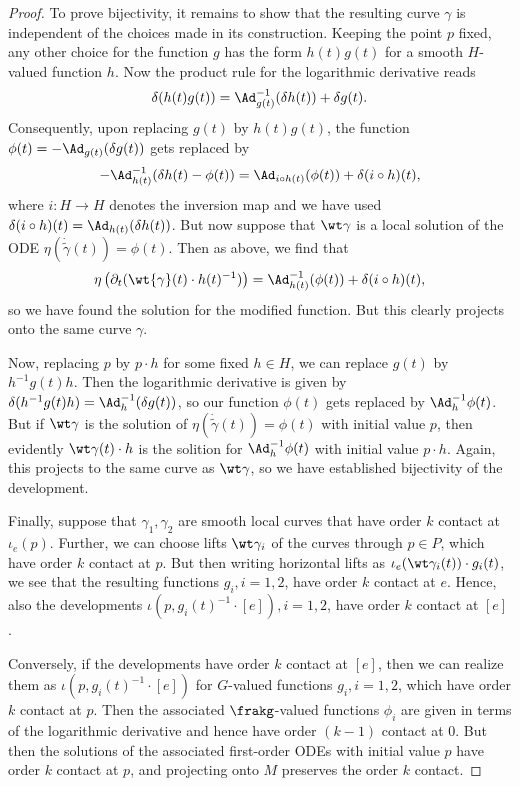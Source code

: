 \begin{proof}
    To prove bijectivity, it remains to show that the resulting curve $\gamma$ is independent of the choices made in its construction. Keeping the point $p$ fixed, any other choice for the function $g$ has the form $h(t)g(t)$ for a smooth $H$-valued function $h$. Now the product rule for the logarithmic derivative reads 
    \[\delta(h(t)g(t))=\Ad_{g(t)}^{-1}(\delta h(t))+\delta g(t).\]
    Consequently, upon replacing $g(t)$ by $h(t)g(t)$, the function $\phi(t)=-\Ad_{g(t)}(\delta g(t))$ gets replaced by 
    \[-\Ad_{h(t)}^{-1}(\delta h(t)-\phi(t))=\Ad_{i\circ h(t)}(\phi(t))+\delta(i\circ h)(t),\]
    where $i:H\to H$ denotes the inversion map and we have used $\delta(i\circ h)(t)=\Ad_{h(t)}(\delta h(t))$. But now suppose that $\wt\gamma$ is a local solution of the ODE $\eta(\dot{\tilde{\gamma}}(t))=\phi(t)$. Then as above, we find that 
    \[\eta\left(\partial_t(\wt{\gamma}(t)\cdot h(t)^{-1})\right)=\Ad_{h(t)}^{-1}(\phi(t))+\delta(i\circ h)(t),\]
    so we have found the solution for the modified function. But this clearly projects onto the same curve $\gamma$.

    Now, replacing $p$ by $p\cdot h$ for some fixed $h\in H$, we can replace $g(t)$ by $h^{-1}g(t)h$. Then the logarithmic derivative is given by $\delta(h^{-1}g(t)h)=\Ad_{h}^{-1}(\delta g(t))$, so our function $\phi(t)$ gets replaced by $\Ad_h^{-1}\phi(t)$. But if $\wt\gamma$ is the solution of $\eta(\dot{\tilde{\gamma}}(t))=\phi(t)$ with initial value $p$, then evidently $\wt\gamma(t)\cdot h$ is the solition for $\Ad_h^{-1}\phi(t)$ with initial value $p\cdot h$. Again, this projects to the same curve as $\wt\gamma$, so we have established bijectivity of the development.

    Finally, suppose that $\gamma_1,\gamma_2$ are smooth local curves that have order $k$ contact at $\iota_e(p)$. Further, we can choose lifts $\wt\gamma_i$ of the curves through $p\in P$, which have order $k$ contact at $p$. But then writing horizontal lifts as $\iota_e(\wt\gamma_i(t))\cdot g_i(t)$, we see that the resulting functions $g_i,i=1,2$, have order $k$ contact at $e$. Hence, also the developments $\iota(p,g_i(t)^{-1}\cdot [e]),i=1,2$, have order $k$ contact at $[e]$.
    
    Conversely, if the developments have order $k$ contact at $[e]$, then we can realize them as $\iota(p,g_i(t)^{-1}\cdot [e])$ for $G$-valued functions $g_i,i=1,2$, which have order $k$ contact at $p$. Then the associated $\frakg$-valued functions $\phi_i$ are given in terms of the logarithmic derivative and hence have order $(k-1)$ contact at $0$. But then the solutions of the associated first-order ODEs with initial value $p$ have order $k$ contact at $p$, and projecting onto $M$ preserves the order $k$ contact.
 \end{proof}

